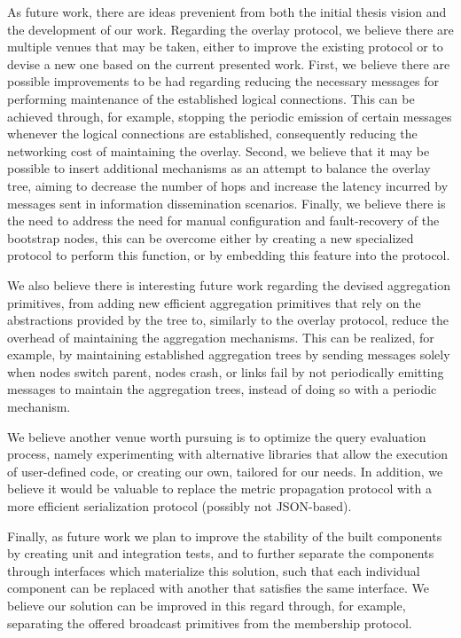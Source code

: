 As future work, there are ideas prevenient from both the initial thesis vision and the development of our work. 
Regarding the overlay protocol, we believe there are multiple venues that may be taken, either to improve the existing protocol or to devise a new one based on the current presented work. First, we believe there are possible improvements to be had regarding reducing the necessary messages for performing maintenance of the established logical connections. This can be achieved through, for example, stopping the periodic emission of certain messages whenever the logical connections are established, consequently reducing the networking cost of maintaining the overlay. Second, we believe that it may be possible to insert additional mechanisms as an attempt to balance the overlay tree, aiming to decrease the number of hops and increase the latency incurred by messages sent in information dissemination scenarios. Finally, we believe there is the need to address the need for manual configuration and fault-recovery of the bootstrap nodes, this can be overcome either by creating a new specialized protocol to perform this function, or by embedding this feature into the protocol.

We also believe there is interesting future work regarding the devised aggregation primitives, from adding new efficient aggregation primitives that rely on the abstractions provided by the tree to, similarly to the overlay protocol, reduce the overhead of maintaining the aggregation mechanisms. This can be realized, for example, by maintaining established aggregation trees by sending messages solely when nodes switch parent, nodes crash, or links fail by not periodically emitting messages to maintain the aggregation trees, instead of doing so with a periodic mechanism.

We believe another venue worth pursuing is to optimize the query evaluation process, namely experimenting with alternative libraries that allow the execution of user-defined code, or creating our own, tailored for our needs. In addition, we believe it would be valuable to replace the metric propagation protocol with a more efficient serialization protocol (possibly not JSON-based).

Finally, as future work we plan to improve the stability of the built components by creating unit and integration tests, and to further separate the components through interfaces which materialize this solution, such that each individual component can be replaced with another that satisfies the same interface. We believe our solution can be improved in this regard through, for example, separating the offered broadcast primitives from the membership protocol. 